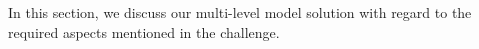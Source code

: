 

In this section, we discuss our multi-level model solution with regard to the
required aspects mentioned in the challenge.


